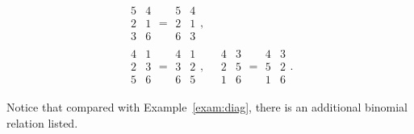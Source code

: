 \documentclass[ALCO,ThmDefs,Unicode,epreuves]{cedram}
\begin{document}
\begin{exam}
\begin{gather*}
\begin{array}{c}5 \\2 \\3\end{array} 
\begin{array}{c}4 \\1 \\6\end{array} = 
\begin{array}{c}5 \\2 \\6\end{array} 
\begin{array}{c}4 \\1 \\3\end{array},
\\
\begin{array}{c}4 \\2 \\5\end{array} 
\begin{array}{c}1 \\3 \\6\end{array} = 
\begin{array}{c}4 \\3 \\6\end{array} 
\begin{array}{c}1 \\2 \\5\end{array},\quad 
\begin{array}{c}4 \\2 \\1\end{array} 
\begin{array}{c}3 \\5 \\6\end{array} = 
\begin{array}{c}4 \\5 \\1\end{array} 
\begin{array}{c}3 \\2 \\6\end{array}.
\end{gather*}
\end{exam}
Notice that compared with Example~\ref{exam:diag}, there is an additional binomial relation listed. 
\end{document}

